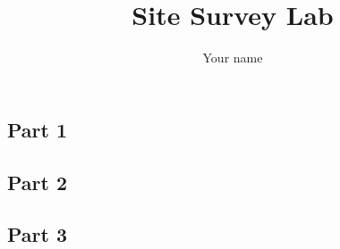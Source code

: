 \documentclass[letterpaper,twocolumn,10pt]{article}
\title{Site Survey Lab}
\author{Your name}
\begin{document}
\maketitle

\subsection*{Part 1}

\subsection*{Part 2}

\subsection*{Part 3}
\end{document}
